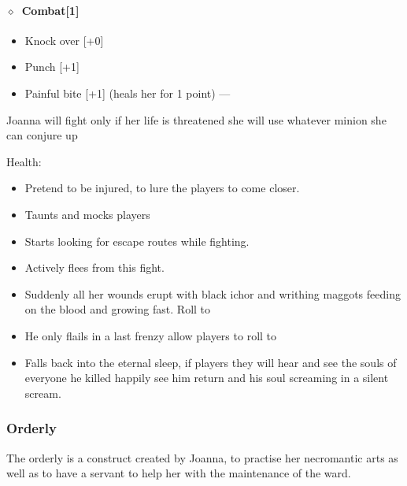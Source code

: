 \documentclass[bg-full]{resources/stylesheets/kult}
\begin{document}
\paragraph{\(\diamond\)~Combat[1]}%
\begin{itemize}[noitemsep]
  \item Knock over [+0]
  \item Punch [+1]
  \item Painful bite [+1] (heals her for 1 point) --- 
\end{itemize}
Joanna will fight only if her life is threatened she will use whatever minion she can conjure up
\KULTrule%

Health:    
   

\begin{itemize}[noitemsep]
  \item Pretend to be injured, to lure the players to come closer.
  \item Taunts and mocks players
  \item Starts looking for escape routes while fighting.
  \item Actively flees from this fight.
  \item Suddenly all her wounds erupt with black ichor and writhing maggots feeding on the blood and growing fast.  Roll to
  \item He only flails in a last frenzy allow players to roll  to 
  \item[\KULTgold{\skull}] Falls back into the eternal sleep, if players  they will
        hear and see the souls of everyone he killed happily see him return and his soul screaming in a silent scream.
\end{itemize}

\subsubsection{Orderly}%
\label{ssub:orderly}
The orderly is a construct created by Joanna, to practise her necromantic arts as well as to have a servant to help her with
the maintenance of the ward.
\end{document}
